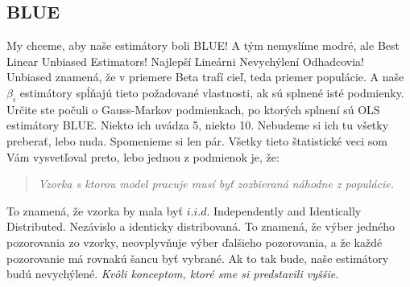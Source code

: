 \hypertarget{blue}{%
\subsection{BLUE}\label{blue}}

My chceme, aby naše estimátory boli BLUE! A tým nemyslíme modré, ale
Best Linear Unbiased Estimators! Najlepší Lineárni Nevychýlení
Odhadcovia! Unbiased znamená, že v priemere Beta trafí cieľ, teda
priemer populácie. A naše \(\beta_i\) estimátory spĺňajú tieto
požadované vlastnosti, ak sú splnené isté podmienky. Určite ste počuli o
Gauss-Markov podmienkach, po ktorých splnení sú OLS estimátory BLUE.
Niekto ich uvádza 5, niekto 10. Nebudeme si ich tu všetky preberať, lebo
nuda. Spomenieme si len pár. Všetky tieto štatistické veci som Vám
vysvetľoval preto, lebo jednou z podmienok je, že:

\begin{center}

\begin{quote}
\emph{Vzorka s ktorou model pracuje musí byť zozbieraná náhodne z
populácie.}
\end{quote}

\end{center}

To znamená, že vzorka by mala byť \(i.i.d\). Independently and
Identically Distributed. Nezávislo a identicky distribovaná. To znamená,
že výber jedného pozorovania zo vzorky, neovplyvňuje výber ďalšieho
pozorovania, a že každé pozorovanie má rovnakú šancu byť vybrané. Ak to
tak bude, naše estimátory budú nevychýlené. \emph{Kvôli konceptom, ktoré
sme si predstavili vyššie.}

\begin{Shaded}
\begin{Highlighting}[]

\StringTok{ }\NormalTok{(} \NormalTok{, } \NormalTok{, } \NormalTok{)}


\NormalTok{(}  \NormalTok{, } \NormalTok{), } \NormalTok{,}
      \NormalTok{, } \NormalTok{, } \NormalTok{)}

\NormalTok{(} \NormalTok{)}
\end{Highlighting}
\end{Shaded}

